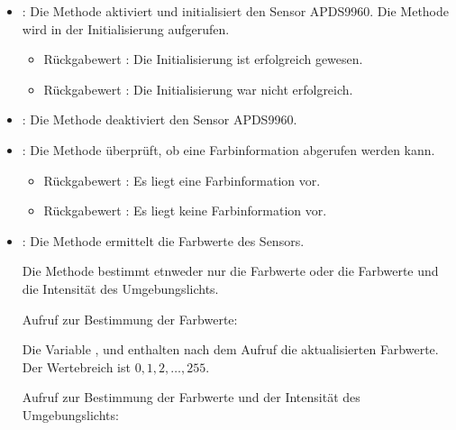 \begin{itemize}
  \item {}: Die Methode  aktiviert und initialisiert den Sensor APDS9960. Die Methode wird in der Initialisierung  aufgerufen.
  
        \medskip
        
        \begin{itemize}
          \item Rückgabewert : Die Initialisierung ist erfolgreich gewesen.
          \item Rückgabewert : Die Initialisierung war nicht erfolgreich.
        \end{itemize}
  
  \item {}: Die Methode  deaktiviert  den Sensor APDS9960.
      
    
  \item {}: Die Methode überprüft, ob eine Farbinformation abgerufen werden kann.

        \medskip

        \begin{itemize}
          \item Rückgabewert : Es liegt eine Farbinformation vor.
          \item Rückgabewert : Es liegt keine Farbinformation vor.
        \end{itemize}

  \item {}: Die Methode ermittelt die Farbwerte des Sensors.

        Die Methode bestimmt etnweder nur die Farbwerte oder die Farbwerte und die Intensität des Umgebungslichts.

        \medskip

        Aufruf zur Bestimmung der Farbwerte:



        \medskip

        Die Variable ,  und   enthalten nach dem Aufruf die aktualisierten Farbwerte. Der Wertebreich ist $0, 1, 2, \ldots, 255$.

        \medskip

        Aufruf zur Bestimmung der Farbwerte und der Intensität des Umgebungslichts:


\end{itemize}
